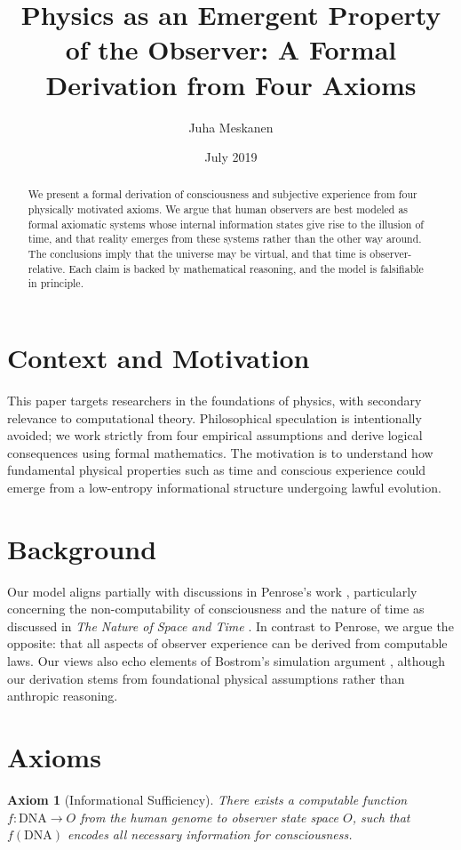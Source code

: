 \documentclass[11pt]{article}
\title{Physics as an Emergent Property of the Observer: A Formal Derivation from Four Axioms}
\author{Juha Meskanen}
\date{July 2019}
\newtheorem{axiom}{Axiom}
\begin{document}
\maketitle

\begin{abstract}
We present a formal derivation of consciousness and subjective experience from four physically motivated axioms. We argue that human observers are best modeled as formal axiomatic systems whose internal information states give rise to the illusion of time, and that reality emerges from these systems rather than the other way around. The conclusions imply that the universe may be virtual, and that time is observer-relative. Each claim is backed by mathematical reasoning, and the model is falsifiable in principle.
\end{abstract}

\section{Context and Motivation}
This paper targets researchers in the foundations of physics, with secondary relevance to computational theory. Philosophical speculation is intentionally avoided; we work strictly from four empirical assumptions and derive logical consequences using formal mathematics. The motivation is to understand how fundamental physical properties such as time and conscious experience could emerge from a low-entropy informational structure undergoing lawful evolution.

\section{Background}
Our model aligns partially with discussions in Penrose's work \cite{penrose1989emperor}, particularly concerning the 
non-computability of consciousness and the nature of time as discussed in \textit{The Nature of Space and Time} \cite{hawking1996nature}. 
In contrast to Penrose, we argue the opposite: that all aspects of observer experience can be derived from computable laws. 
Our views also echo elements of Bostrom's simulation argument \cite{bostrom2003}, although our derivation stems from foundational 
physical assumptions rather than anthropic reasoning.


\section{Axioms}

\begin{axiom}[Informational Sufficiency]
There exists a computable function $f: \text{DNA} \rightarrow O$ from the human genome to observer state space $O$, such that $f(\text{DNA})$ encodes all necessary information for consciousness.
\end{axiom}
\end{document}
